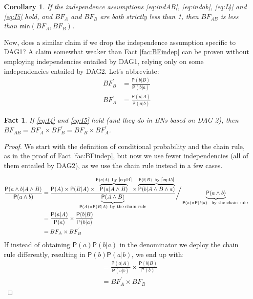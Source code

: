 \documentclass[
  10pt,
  dvipsnames,enabledeprecatedfontcommands]{scrartcl}
\newtheorem{fact}{Fact}
\newcommand{\et}{\wedge}
\newcommand{\pr}[1]{\ensuremath{\mathsf{P}(#1)}}
\newtheorem{corollary}{Corollary}[fact]
\begin{document}
\begin{corollary} If the independence assumptions \eqref{eq:indAB}, \eqref{eq:indab}, \eqref{eq:I4} and \eqref{eq:I5} hold, and $BF_{A}$ and $BF_{B}$ are both strictly less than 1, then $BF_{AB}$  is less than  $\mathsf{min}(BF_{A}, BF_{B})$. \label{cor:BFind3}
\end{corollary}

Now, does a similar claim if we drop the independence assumption
specific to \textsf{DAG1}? A claim somewhat weaker than Fact
\ref{fac:BFindep} can be proven without employing independencies
entailed by \textsf{DAG1}, relying only on some independencies entailed
by \textsf{DAG2}. Let's abbreviate: \begin{align*}
BF^{'}_{B} & = \frac{\pr{b \vert B}}{\pr{b\vert a}} \\
BF^{'}_{A} & = \frac{\pr{a \vert A}}{\pr{a \vert b}}
\end{align*}

\begin{fact} If \eqref{eq:I4} and \eqref{eq:I5}  hold (and they do in BNs based on \textsf{DAG 2}), then $BF_{AB} =  BF_{A}\times BF^{'}_{B}  = BF_{B} \times BF^{'}_{A}$. \label{fac:BFdep}
\end{fact}

\begin{proof}

We start with the definition of conditional probability and the chain rule, as in the proof of Fact \ref{fac:BFindep}, but now we use fewer  independencies (all of them entailed by \textsf{DAG2}), as we use the chain rule instead in a few cases. 

 \begin{align*}
\frac{\pr{a \wedge b\vert A\wedge B}}{\pr{a \wedge b}} &
= \frac{\pr{A} \times \pr {B \vert A}  \times
\overbrace{\pr{a \vert A \et B}}^{\pr{a \vert A} \mbox{\footnotesize \, by \eqref{eq:I4}}}
\times \overbrace{\pr{b \vert A \et B \et a}}^{\pr{b \vert B} \mbox{\footnotesize \, by \eqref{eq:I5}}}
}{\underbrace{\pr{A \et B}}_{\pr{A} \times \pr{B\vert A} \mbox{\footnotesize \, by the chain rule}}} \bigg/ \underbrace{\pr{a \wedge b}}_{\pr{a}\times \pr{b\vert a} \mbox{ \footnotesize \, by the chain rule }}\\
& = \frac{\pr{a \vert A}}{\pr{a}} \times \frac{\pr{b\vert B}}{\pr{b \vert a}}\\
& = BF_{A} \times BF^{'}_{B}
\end{align*}
If instead of obtaining $\pr{a}\pr{b \vert a}$ in the denominator we deploy the chain rule differently, resulting in $\pr{b}\pr{a \vert b}$, we end up with:
\begin{align*}
& = \frac{\pr{a \vert A}}{\pr{a \vert b}} \times \frac{\pr{b\vert B}}{\pr{b}}\\
& = BF^{'}_{A} \times BF_{B}
\end{align*}

\end{proof}
\end{document}
